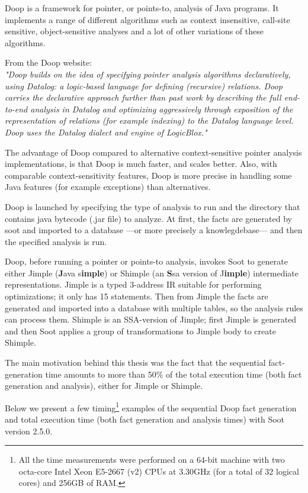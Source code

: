 \documentclass{dithesis}
\begin{document}
    Doop \cite{Doop: Framework for Java Pointer Analysis} is a framework for pointer, or points-to, analysis of Java programs. It implements a range of different algorithms such as context insensitive, call-site sensitive, object-sensitive analyses and a lot of other variations of these algorithms.

	From the Doop website: \\
    \textit{"Doop builds on the idea of specifying pointer analysis algorithms declaratively, using Datalog: a logic-based language for defining (recursive) relations. Doop carries the declarative approach further than past work by describing the full end-to-end analysis in Datalog and optimizing aggressively through exposition of the representation of relations (for example indexing) to the Datalog language level. Doop uses the Datalog dialect and engine of LogicBlox."}

    The advantage of Doop compared to alternative context-sensitive pointer analysis implementations, is that Doop is much faster, and scales better. Also, with comparable context-sensitivity features, Doop is more precise in handling some Java features (for example exceptions) than alternatives.

    Doop is launched by specifying the type of analysis to run and the directory that contains java bytecode (.jar file) to analyze. At first, the facts are generated by soot and imported to a database ---or more precisely a knowlegdebase--- and then the specified analysis is run. 

        Doop, before running a pointer or points-to analysis, invokes Soot to generate either Jimple (\textbf{J}ava s\textbf{imple}) or Shimple (an \textbf{S}sa version of J\textbf{imple}) intermediate representations. Jimple is a typed 3-address IR suitable for performing optimizations; it only has 15 statements. Then from Jimple the facts are generated and imported into a database with multiple tables, so the analysis rules can process them. Shimple is an SSA-version of Jimple; first Jimple is generated and then Soot applies a group of transformations to Jimple body to create Shimple.

        The main motivation behind this thesis was the fact that the sequential fact-generation time amounts to more than 50\% of the total execution time (both fact generation and analysis), either for Jimple or Shimple.


        Below we present a few timing\footnote{All the time measurements were performed on a 64-bit machine with two octa-core Intel Xeon E5-2667 (v2) CPUs at 3.30GHz (for a total of 32 logical cores) and 256GB of RAM.} examples of the sequential Doop fact generation and total execution time (both fact generation and analysis times) with Soot version 2.5.0.
\end{document}
